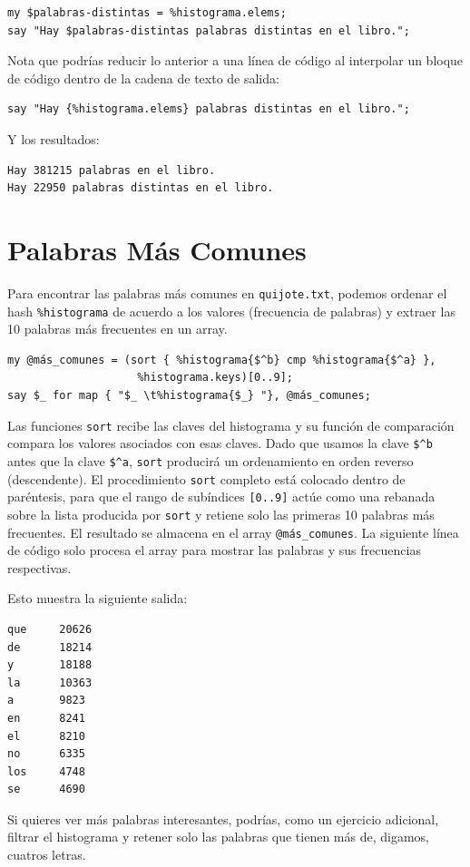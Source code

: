 \begin{verbatim}
my $palabras-distintas = %histograma.elems;
say "Hay $palabras-distintas palabras distintas en el libro.";
\end{verbatim}
%
Nota que podrías reducir lo anterior a una línea de código al
interpolar un bloque de código dentro de la cadena de texto de salida:

\begin{verbatim}
say "Hay {%histograma.elems} palabras distintas en el libro.";
\end{verbatim}
%
Y los resultados:

\begin{verbatim}
Hay 381215 palabras en el libro.
Hay 22950 palabras distintas en el libro.
\end{verbatim}
%


\section{Palabras Más Comunes}
\label{most_common_words}

Para encontrar las palabras más comunes en \verb|quijote.txt|,
podemos ordenar el hash \verb|%histograma| de acuerdo a los 
valores (frecuencia de palabras) y extraer las 10 palabras más
frecuentes en un array.

\begin{verbatim}
my @más_comunes = (sort { %histograma{$^b} cmp %histograma{$^a} }, 
                    %histograma.keys)[0..9];
say $_ for map { "$_ \t%histograma{$_} "}, @más_comunes;
\end{verbatim}

Las funciones {\tt sort} recibe las claves del histograma y su función 
de comparación compara los valores asociados con esas claves. Dado que
usamos la clave \verb|$^b| antes que la clave \verb|$^a|, {\tt sort}
producirá un ordenamiento en orden reverso (descendente). El procedimiento
{\tt sort} completo está colocado dentro de paréntesis, para que el rango 
de subíndices {\tt [0..9]} actúe como una rebanada sobre la lista producida por
{\tt sort} y retiene solo las primeras 10 palabras más frecuentes. El resultado
se almacena en el array \verb|@más_comunes|. La siguiente línea de código 
solo procesa el array para mostrar las palabras y sus frecuencias respectivas.

Esto muestra la siguiente salida:

\begin{verbatim}
que     20626 
de      18214 
y       18188 
la      10363 
a       9823 
en      8241 
el      8210 
no      6335 
los     4748 
se      4690 
\end{verbatim}
%
Si quieres ver más palabras interesantes, podrías, como un ejercicio
adicional, filtrar el histograma y retener solo las palabras
que tienen más de, digamos, cuatros letras.


